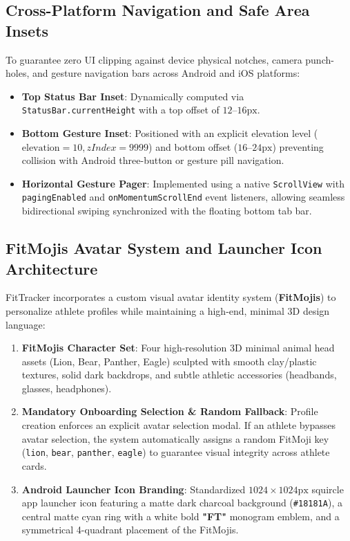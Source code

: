 \subsection{Cross-Platform Navigation and Safe Area Insets}
To guarantee zero UI clipping against device physical notches, camera punch-holes, and gesture navigation bars across Android and iOS platforms:
\begin{itemize}
    \item \textbf{Top Status Bar Inset}: Dynamically computed via \texttt{StatusBar.currentHeight} with a top offset of $12\text{--}16\text{px}$.
    \item \textbf{Bottom Gesture Inset}: Positioned with an explicit elevation level ($\text{elevation} = 10, zIndex = 9999$) and bottom offset ($16\text{--}24\text{px}$) preventing collision with Android three-button or gesture pill navigation.
    \item \textbf{Horizontal Gesture Pager}: Implemented using a native \texttt{ScrollView} with \texttt{pagingEnabled} and \texttt{onMomentumScrollEnd} event listeners, allowing seamless bidirectional swiping synchronized with the floating bottom tab bar.
\end{itemize}

\subsection{FitMojis Avatar System and Launcher Icon Architecture}
FitTracker incorporates a custom visual avatar identity system (\textbf{FitMojis}) to personalize athlete profiles while maintaining a high-end, minimal 3D design language:
\begin{enumerate}
    \item \textbf{FitMojis Character Set}: Four high-resolution 3D minimal animal head assets (Lion, Bear, Panther, Eagle) sculpted with smooth clay/plastic textures, solid dark backdrops, and subtle athletic accessories (headbands, glasses, headphones).
    \item \textbf{Mandatory Onboarding Selection \& Random Fallback}: Profile creation enforces an explicit avatar selection modal. If an athlete bypasses avatar selection, the system automatically assigns a random FitMoji key (\texttt{lion}, \texttt{bear}, \texttt{panther}, \texttt{eagle}) to guarantee visual integrity across athlete cards.
    \item \textbf{Android Launcher Icon Branding}: Standardized $1024 \times 1024\text{px}$ squircle app launcher icon featuring a matte dark charcoal background (\texttt{\#18181A}), a central matte cyan ring with a white bold \textbf{"FT"} monogram emblem, and a symmetrical 4-quadrant placement of the FitMojis.
\end{enumerate}

